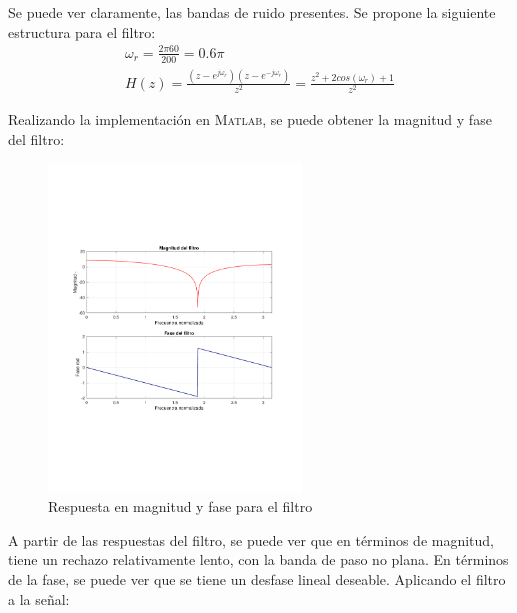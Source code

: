 		Se puede ver claramente, las bandas de ruido presentes. Se propone la siguiente estructura para el filtro:
		\begin{align}
			\omega_{r} = \frac{2\pi 60}{200} = 0.6\pi \\
			H(z) = \frac{(z-e^{j\omega_r})(z-e^{-j\omega_r})}{z^{2}} = \frac{z^{2} + 2cos(\omega_{r}) + 1}{z^{2}}
		\end{align}
		
		Realizando la implementación en \textsc{Matlab}, se puede obtener la magnitud y fase del filtro:
		\begin{figure}[H]
			\center
			\includegraphics[width=0.6\textwidth,clip, trim = {1.9cm 6.8cm 2.3cm 7cm}]{../plots/ecg_poles_0.pdf}
			\caption{Respuesta en magnitud y fase para el filtro}
			\label{fig:mag_phase_p_0}
		\end{figure}
		
		A partir de las respuestas del filtro, se puede ver que en términos de magnitud, tiene un rechazo relativamente lento, con la banda de paso no plana. En términos de la fase, se puede ver que se tiene un desfase lineal deseable. Aplicando el filtro a la señal:
		
